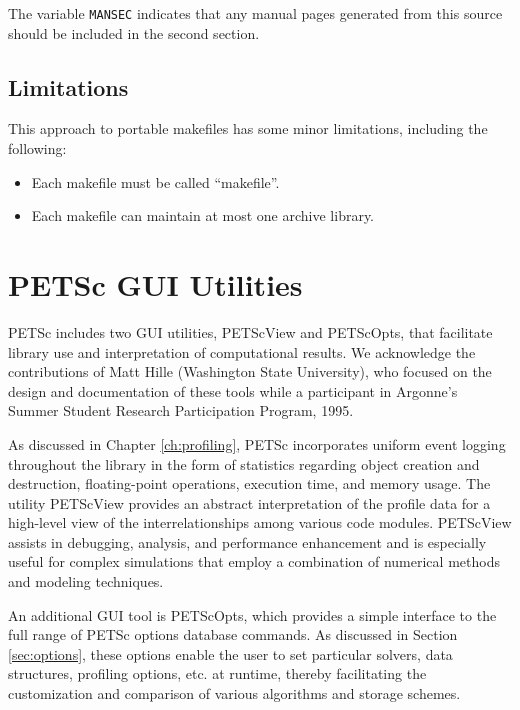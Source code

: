 The variable {\tt MANSEC} indicates that any manual pages generated
from this source should be included in the second section. 

\section{Limitations}

This approach to portable makefiles has some minor limitations, including
the following:
\begin{itemize}
\item Each makefile must be called ``makefile''.
\item Each makefile can maintain at most one archive library.
\end{itemize}



\chapter{PETSc GUI Utilities}
\label{ch:petsc_gui}

PETSc includes two GUI utilities, PETScView and PETScOpts, that
facilitate library use and interpretation of computational results.
We acknowledge the contributions of Matt Hille (Washington State
University), who focused on the design and documentation of these
tools while a participant in Argonne's Summer Student Research
Participation Program, 1995.

As discussed in Chapter \ref{ch:profiling}, PETSc incorporates uniform
event logging throughout the library in the form of statistics
regarding object creation and destruction, floating-point operations,
execution time, and memory usage.  The utility PETScView provides an
abstract interpretation of the profile data for a high-level view of
the interrelationships among various code modules.  PETScView assists
in debugging, analysis, and performance enhancement and is especially
useful for complex simulations that employ a combination of numerical
methods and modeling techniques.

An additional GUI tool is PETScOpts, which provides a simple interface to
the full range of PETSc options database commands.  As discussed in Section
\ref{sec:options}, these options enable the user to set particular
solvers, data structures, profiling options, etc. at runtime, thereby
facilitating the customization and comparison of various algorithms
and storage schemes.

